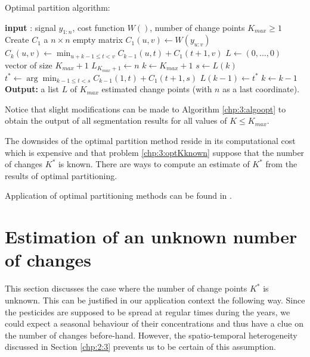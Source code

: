 \begin{algorithm}[ht]
\caption{Optimal partition algorithm:}\label{chp:3:algoopt}
\begin{algorithmic}

\State \textbf{input} : signal $y_{1:n}$, cost function $W()$, number of change points $K_{max} \geq 1$
\State Create $C_1$ a $n\times n$ empty matrix
  \State $C_1(u,v) \gets W(y_{u:v})$
\EndFor
{}
      \State $C_k(u,v) \gets \min_{u+k-1 \leq t < v} C_{k-1}(u,t) + C_1(t+1,v)$ 
    \EndFor
  \EndFor
\EndIf
\State $L \gets (0,...,0)$ vector of size $K_{max}+1$
\State $L_{K_{max}+1} \gets n$
\State $k \gets K_{max}+1$
  \State $s \gets L(k)$
  \State $t^* \gets \arg\min_{k-1\leq t < s}C_{k-1}(1,t)+C_1(t+1,s)$
  \State $L(k-1) \gets t^*$
  \State $k \gets k-1$
\EndWhile
\State \textbf{Output:} a list $L$ of $K_{max}$ estimated change points (with $n$ as a last coordinate).
\end{algorithmic}
\end{algorithm} 

Notice that slight modifications can be made to Algorithm \ref{chp:3:algoopt} to obtain the output of all segmentation results for all values of $K\leq K_{max}$. 

The downsides of the optimal partition method reside in its computational cost which is expensive and that problem \eqref{chp:3:optKknown} suppose that the number of changes $K^*$ is known. There are ways to compute an estimate of $K^*$ from the results of optimal partitioning. 

Application of optimal partitioning methods can be found in \cite{rigaill2015pruned,Lavielle1997,perron2006dealing}.


\section{Estimation of an unknown number of changes}\label{chp:3:3}

This section discusses the case where the number of change points $K^*$ is unknown. This can be justified in our application context the following way. Since the pesticides are supposed to be spread at regular times during the years, we could expect a seasonal behaviour of their concentrations and thus have a clue on the number of changes before-hand. However, the spatio-temporal heterogeneity discussed in Section \ref{chp:2:3} prevents us to be certain of this assumption. 

